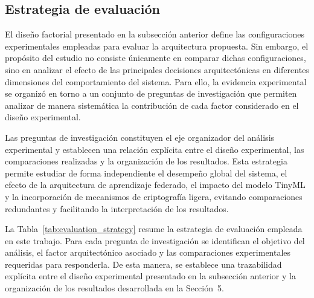 \documentclass[journal,article,submit,moreauthors]{Definitions/mdpi}
\begin{document}
\subsection{Estrategia de evaluación}
El diseño factorial presentado en la subsección anterior define las configuraciones experimentales empleadas para evaluar la arquitectura propuesta. Sin embargo, el propósito del estudio no consiste únicamente en comparar dichas configuraciones, sino en analizar el efecto de las principales decisiones arquitectónicas en diferentes dimensiones del comportamiento del sistema. Para ello, la evidencia experimental se organizó en torno a un conjunto de preguntas de investigación que permiten analizar de manera sistemática la contribución de cada factor considerado en el diseño experimental.

Las preguntas de investigación constituyen el eje organizador del análisis experimental y establecen una relación explícita entre el diseño experimental, las comparaciones realizadas y la organización de los resultados. Esta estrategia permite estudiar de forma independiente el desempeño global del sistema, el efecto de la arquitectura de aprendizaje federado, el impacto del modelo TinyML y la incorporación de mecanismos de criptografía ligera, evitando comparaciones redundantes y facilitando la interpretación de los resultados.

La Tabla~\ref{tab:evaluation_strategy} resume la estrategia de evaluación empleada en este trabajo. Para cada pregunta de investigación se identifican el objetivo del análisis, el factor arquitectónico asociado y las comparaciones experimentales requeridas para responderla. De esta manera, se establece una trazabilidad explícita entre el diseño experimental presentado en la subsección anterior y la organización de los resultados desarrollada en la Sección~5.
\end{document}
